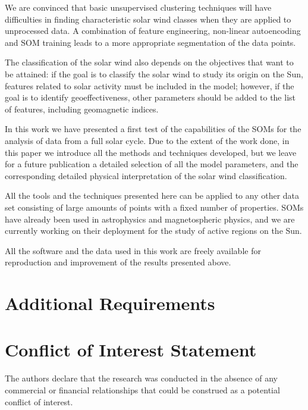 \documentclass[utf8]{frontiersSCNS} %
\begin{document}
We are convinced that basic unsupervised clustering techniques will have difficulties in finding characteristic solar wind classes when they are applied to unprocessed data. A combination of feature engineering, non-linear autoencoding and SOM training leads to a more appropriate segmentation of the data points.

The classification of the solar wind also depends on the objectives that want to be attained: if the goal is to classify the solar wind to study its origin on the Sun, features related to solar activity must be included in the model; however, if the goal is to identify geoeffectiveness, other parameters should be added to the list of features, including geomagnetic indices.

In this work we have presented a first test of the capabilities of the SOMs for the analysis of data from a full solar cycle. Due to the extent of the work done, in this paper we introduce all the methods and techniques developed, but we leave for a future publication a detailed selection of all the model parameters, and the corresponding detailed physical interpretation of the solar wind classification.

All the tools and the techniques presented here can be applied to any other data set consisting of large amounts of points with a fixed number of properties. SOMs have already been used in astrophysics\citep{Suveges2017} and magnetospheric physics\citep{Camporeale2018}, and we are currently working on their deployment for the study of active regions on the Sun.

All the software and the data used in this work are freely available for reproduction and improvement of the results presented above.

\section{Additional Requirements}

\section*{Conflict of Interest Statement}

The authors declare that the research was conducted in the absence of any commercial or financial relationships that could be construed as a potential conflict of interest.
\end{document}
